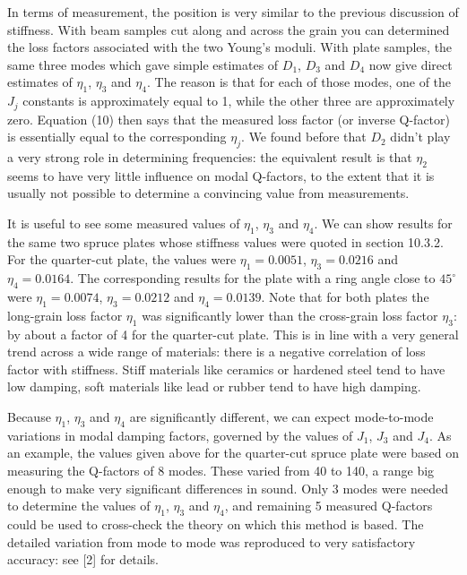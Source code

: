   In terms of measurement, the position is very similar to the previous 
  discussion of stiffness. With beam samples cut along and across the grain you 
  can determined the loss factors associated with the two Young's moduli. With 
  plate samples, the same three modes which gave simple estimates of $D_1$, 
  $D_3$ and $D_4$ now give direct estimates of $\eta_1$, $\eta_3$ and $\eta_4$. 
  The reason is that for each of those modes, one of the $J_j$ constants is 
  approximately equal to 1, while the other three are approximately zero. 
  Equation (10) then says that the measured loss factor (or inverse Q-factor) 
  is essentially equal to the corresponding $\eta_j$. We found before that 
  $D_2$ didn't play a very strong role in determining frequencies: the 
  equivalent result is that $\eta_2$ seems to have very little influence on 
  modal Q-factors, to the extent that it is usually not possible to determine a 
  convincing value from measurements. 

  It is useful to see some measured values of $\eta_1$, $\eta_3$ and $\eta_4$. 
  We can show results for the same two spruce plates whose stiffness values 
  were quoted in section 10.3.2. For the quarter-cut plate, the values were 
  $\eta_1 = 0.0051$, $\eta_3 = 0.0216$ and $\eta_4 = 0.0164$. The corresponding 
  results for the plate with a ring angle close to $45^\circ$ were $\eta_1 = 
  0.0074$, $\eta_3 = 0.0212$ and $\eta_4 = 0.0139$. Note that for both plates 
  the long-grain loss factor $\eta_1$ was significantly lower than the 
  cross-grain loss factor $\eta_3$: by about a factor of 4 for the quarter-cut 
  plate. This is in line with a very general trend across a wide range of 
  materials: there is a negative correlation of loss factor with stiffness. 
  Stiff materials like ceramics or hardened steel tend to have low damping, 
  soft materials like lead or rubber tend to have high damping. 

  Because $\eta_1$, $\eta_3$ and $\eta_4$ are significantly different, we can 
  expect mode-to-mode variations in modal damping factors, governed by the 
  values of $J_1$, $J_3$ and $J_4$. As an example, the values given above for 
  the quarter-cut spruce plate were based on measuring the Q-factors of 8 
  modes. These varied from 40 to 140, a range big enough to make very 
  significant differences in sound. Only 3 modes were needed to determine the 
  values of $\eta_1$, $\eta_3$ and $\eta_4$, and remaining 5 measured Q-factors 
  could be used to cross-check the theory on which this method is based. The 
  detailed variation from mode to mode was reproduced to very satisfactory 
  accuracy: see [2] for details. 

